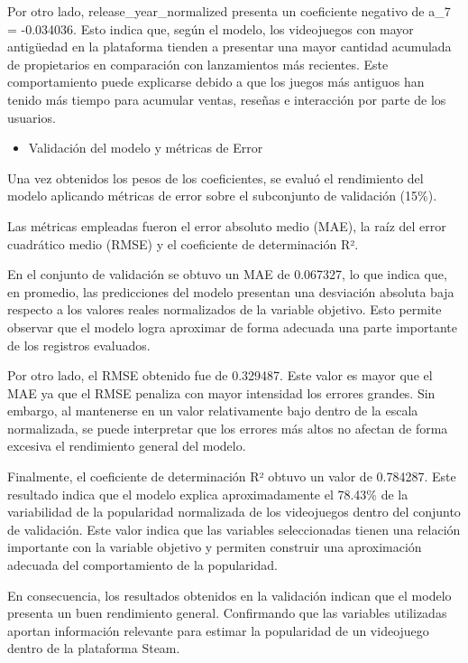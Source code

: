 \documentclass[12pt]{report}
\begin{document}
Por otro lado, release\_year\_normalized presenta un coeficiente negativo de a\_7 = -0.034036. Esto indica que, según el modelo, los videojuegos con mayor antigüedad en la plataforma tienden a presentar una mayor cantidad acumulada de propietarios en comparación con lanzamientos más recientes. Este comportamiento puede explicarse debido a que los juegos más antiguos han tenido más tiempo para acumular ventas, reseñas e interacción por parte de los usuarios.

\begin{itemize}
    \item Validación del modelo y métricas de Error
\end{itemize}
Una vez obtenidos los pesos de los coeficientes, se evaluó el rendimiento del modelo aplicando métricas de error sobre el subconjunto de validación (15\%). 

Las métricas empleadas fueron el error absoluto medio (MAE), la raíz del error cuadrático medio (RMSE) y el coeficiente de determinación R².

En el conjunto de validación se obtuvo un MAE de 0.067327, lo que indica que, en promedio, las predicciones del modelo presentan una desviación absoluta baja respecto a los valores reales normalizados de la variable objetivo. Esto permite observar que el modelo logra aproximar de forma adecuada una parte importante de los registros evaluados.

Por otro lado, el RMSE obtenido fue de 0.329487. Este valor es mayor que el MAE ya que el RMSE penaliza con mayor intensidad los errores grandes. Sin embargo, al mantenerse en un valor relativamente bajo dentro de la escala normalizada, se puede interpretar que los errores más altos no afectan de forma excesiva el rendimiento general del modelo.

Finalmente, el coeficiente de determinación R² obtuvo un valor de 0.784287. Este resultado indica que el modelo explica aproximadamente el 78.43\% de la variabilidad de la popularidad normalizada de los videojuegos dentro del conjunto de validación. Este valor indica que las variables seleccionadas tienen una relación importante con la variable objetivo y permiten construir una aproximación adecuada del comportamiento de la popularidad.

En consecuencia, los resultados obtenidos en la validación indican que el modelo presenta un buen rendimiento general. Confirmando que las variables utilizadas aportan información relevante para estimar la popularidad de un videojuego dentro de la plataforma Steam.
\end{document}
